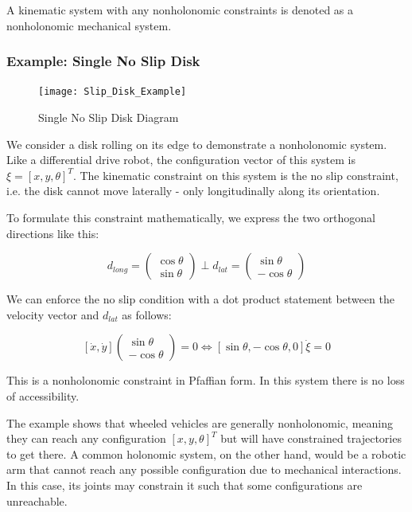 \documentclass[twoside]{article}
\begin{document}
A kinematic system with any nonholonomic constraints is denoted as a nonholonomic mechanical system.

\subsubsection*{Example: Single No Slip Disk \cite{ssvo}}

\begin{figure}[H]
\centering
\texttt{[image: Slip\_Disk\_Example]}
\caption{Single No Slip Disk Diagram}
\end{figure}

We consider a disk rolling on its edge to demonstrate a nonholonomic system. Like a differential drive robot, the configuration vector of this system is $ \xi = [x, y, \theta]^T $. The kinematic constraint on this system is the no slip constraint, i.e. the disk cannot move laterally - only longitudinally along its orientation.

To formulate this constraint mathematically, we express the two orthogonal directions like this:

\[ d_{long} =
\begin{pmatrix} \cos \theta \\ \sin \theta \end{pmatrix}
\perp
d_{lat} =
\begin{pmatrix} \sin \theta \\ -\cos \theta \end{pmatrix}
\]

We can enforce the no slip condition with a dot product statement between the velocity vector and $ d_{lat} $ as follows:

$$
[\dot{x},  \dot{y}] \begin{pmatrix} \sin \theta \\ -\cos \theta \end{pmatrix} = 0 \iff
[\sin \theta, -\cos \theta, 0] \dot{\xi} = 0
$$

This is a nonholonomic constraint in Pfaffian form. In this system there is no loss of accessibility.

The example shows that wheeled vehicles are generally nonholonomic, meaning they can reach any configuration $[x,y,\theta]^T$ but will have constrained trajectories to get there. A common holonomic system, on the other hand, would be a robotic arm that cannot reach any possible configuration due to mechanical interactions. In this case, its joints may constrain it such that some configurations are unreachable.
\end{document}
